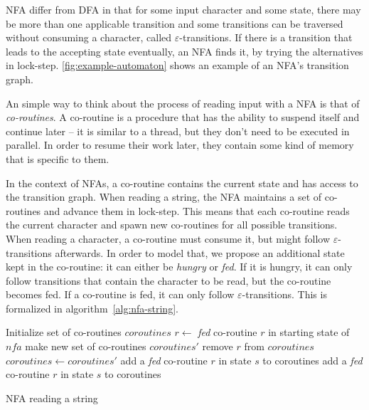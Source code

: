 \documentclass[11pt]{Thesis}
\theoremstyle{definition}
\begin{document}
NFA differ from DFA in that for some input character and some state, there
may be more than one applicable transition and some transitions can be
traversed without consuming a character, called $\varepsilon$-transitions.  If
there is a transition that leads to the accepting state eventually, an NFA
finds it, by trying the alternatives in lock-step.
\autoref{fig:example-automaton} shows an example of an NFA's transition graph.

An simple way to think about the process of reading input with a NFA is that 
of \emph{co-routines}. A co-routine is a procedure that has the ability to 
suspend itself and continue later -- it is similar to a thread, but they 
don't need to be executed in parallel. In order to resume their work later, 
they contain some kind of memory that is specific to them.

In the context of NFAs, a co-routine contains the current state and has access
to the transition graph. When reading a 
string, the NFA maintains a set of co-routines and advance them in 
lock-step. This means that each co-routine reads the current character and 
spawn new co-routines for all possible transitions. When reading a character, 
a co-routine must consume it, but might follow $\varepsilon$-transitions 
afterwards. In order to model that, we propose an additional state kept in 
the co-routine: it can either be \emph{hungry} or \emph{fed}. If it is 
hungry, it can only follow transitions that contain the character to be read, 
but the co-routine becomes fed. If a co-routine is fed, it can only 
follow $\varepsilon$-transitions. This is formalized in algorithm~\ref{alg:nfa-string}.


\begin{algorithm*}
  \begin{algorithmic}
    \State Initialize set of co-routines $coroutines$
    \State $r\leftarrow$ \emph{fed} co-routine $r$ in starting state of $nfa$
    \State {}
      \State make new set of co-routines $coroutines'$
        \State remove $r$ from $coroutines$
        \State {}
      \EndFor
      \State $coroutines \leftarrow coroutines'$
    \EndFor
  \EndFunction
  \Statex
        \State add a \emph{fed} co-routine $r$ in state $s$ to coroutines
        \State {}
      \EndIf
    \EndFor
  \EndFunction
  \Statex
        \State add a \emph{fed} co-routine $r$ in state $s$ to coroutines
        \State {}
      \EndIf
    \EndFor
  \EndFunction
  \end{algorithmic}
  \caption{\label{alg:nfa-string}NFA reading a string}
\end{algorithm*}
\end{document}
